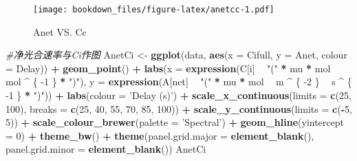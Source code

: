 \documentclass[
]{krantz}
\makeatletter
\newenvironment{Shaded}{\begin{snugshade}}{\end{snugshade}}
\newcommand{\CommentTok}[1]{\textcolor[rgb]{0.56,0.35,0.01}{\textit{#1}}}
\newcommand{\DataTypeTok}[1]{\textcolor[rgb]{0.13,0.29,0.53}{#1}}
\newcommand{\DecValTok}[1]{\textcolor[rgb]{0.00,0.00,0.81}{#1}}
\newcommand{\KeywordTok}[1]{\textcolor[rgb]{0.13,0.29,0.53}{\textbf{#1}}}
\newcommand{\NormalTok}[1]{#1}
\newcommand{\OperatorTok}[1]{\textcolor[rgb]{0.81,0.36,0.00}{\textbf{#1}}}
\newcommand{\StringTok}[1]{\textcolor[rgb]{0.31,0.60,0.02}{#1}}
\newenvironment{kframe}{%
\medskip{}
\setlength{\fboxsep}{.8em}
 \def\at@end@of@kframe{}%
 \ifinner\ifhmode%
  \def\at@end@of@kframe{\end{minipage}}%
  \begin{minipage}{\columnwidth}%
 \fi\fi%
 \def\FrameCommand##1{\hskip\@totalleftmargin \hskip-\fboxsep
 \colorbox{shadecolor}{##1}\hskip-\fboxsep
     \hskip-\linewidth \hskip-\@totalleftmargin \hskip\columnwidth}%
 \MakeFramed {\advance\hsize-\width
   \@totalleftmargin\z@ \linewidth\hsize
   \@setminipage}}%
 {\par\unskip\endMakeFramed%
 \at@end@of@kframe}
\renewenvironment{Shaded}{\begin{kframe}}{\end{kframe}}
\makeatother
\begin{document}
\begin{figure}
\centering
\texttt{[image: bookdown\_files/figure-latex/anetcc-1.pdf]}
\caption{\label{fig:anetcc}Anet VS. Cc}
\end{figure}

\begin{Shaded}
\begin{Highlighting}[]
\CommentTok{#净光合速率与Ci作图}
\NormalTok{AnetCi <-}\StringTok{ }\KeywordTok{ggplot}\NormalTok{(data, }\KeywordTok{aes}\NormalTok{(}\DataTypeTok{x =}\NormalTok{ Cifull, }\DataTypeTok{y =}\NormalTok{ Anet, }\DataTypeTok{colour =}\NormalTok{ Delay)) }\OperatorTok{+}
\StringTok{  }\KeywordTok{geom_point}\NormalTok{() }\OperatorTok{+}
\StringTok{  }\KeywordTok{labs}\NormalTok{(}\DataTypeTok{x =} \KeywordTok{expression}\NormalTok{(C[i] }\OperatorTok{~}\StringTok{ "("} \OperatorTok{*}\StringTok{ }\NormalTok{mu }\OperatorTok{*}\StringTok{ }\NormalTok{mol }\OperatorTok{~}\StringTok{ }\NormalTok{mol }\OperatorTok{^}\StringTok{ }\NormalTok{\{}
    \DecValTok{-1}
\NormalTok{  \} }\OperatorTok{*}\StringTok{ ")"}\NormalTok{),}
  \DataTypeTok{y =} \KeywordTok{expression}\NormalTok{(A[net] }\OperatorTok{~}\StringTok{ "("} \OperatorTok{*}\StringTok{ }\NormalTok{mu }\OperatorTok{*}\StringTok{ }\NormalTok{mol }\OperatorTok{~}\StringTok{ }\NormalTok{m }\OperatorTok{^}\StringTok{ }\NormalTok{\{}
    \DecValTok{-2}
\NormalTok{  \} }\OperatorTok{~}\StringTok{ }\NormalTok{s }\OperatorTok{^}\StringTok{ }\NormalTok{\{}
    \DecValTok{-1}
\NormalTok{  \} }\OperatorTok{*}\StringTok{ ")"}\NormalTok{)) }\OperatorTok{+}
\StringTok{  }\KeywordTok{labs}\NormalTok{(}\DataTypeTok{colour =} \StringTok{'Delay (s)'}\NormalTok{) }\OperatorTok{+}
\StringTok{  }\KeywordTok{scale_x_continuous}\NormalTok{(}\DataTypeTok{limits =} \KeywordTok{c}\NormalTok{(}\DecValTok{25}\NormalTok{, }\DecValTok{100}\NormalTok{),}
                     \DataTypeTok{breaks =} \KeywordTok{c}\NormalTok{(}\DecValTok{25}\NormalTok{, }\DecValTok{40}\NormalTok{, }\DecValTok{55}\NormalTok{, }\DecValTok{70}\NormalTok{, }\DecValTok{85}\NormalTok{, }\DecValTok{100}\NormalTok{)) }\OperatorTok{+}
\StringTok{  }\KeywordTok{scale_y_continuous}\NormalTok{(}\DataTypeTok{limits =} \KeywordTok{c}\NormalTok{(}\OperatorTok{-}\DecValTok{5}\NormalTok{, }\DecValTok{5}\NormalTok{)) }\OperatorTok{+}
\StringTok{  }\KeywordTok{scale_colour_brewer}\NormalTok{(}\DataTypeTok{palette =} \StringTok{'Spectral'}\NormalTok{) }\OperatorTok{+}
\StringTok{  }\KeywordTok{geom_hline}\NormalTok{(}\DataTypeTok{yintercept =} \DecValTok{0}\NormalTok{) }\OperatorTok{+}
\StringTok{  }\KeywordTok{theme_bw}\NormalTok{() }\OperatorTok{+}
\StringTok{  }\KeywordTok{theme}\NormalTok{(}\DataTypeTok{panel.grid.major =} \KeywordTok{element_blank}\NormalTok{(),}
        \DataTypeTok{panel.grid.minor =} \KeywordTok{element_blank}\NormalTok{())}
\NormalTok{AnetCi}
\end{Highlighting}
\end{Shaded}
\end{document}
